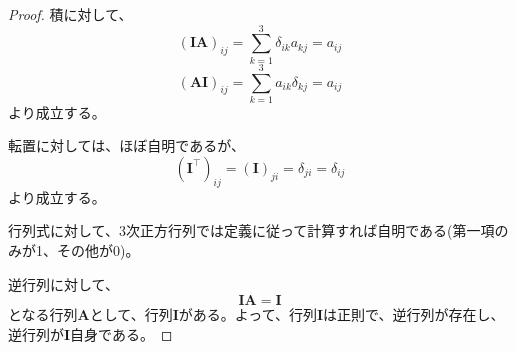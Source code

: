\begin{proof}
	積に対して、
	\begin{equation}
		(\boldsymbol{I}\boldsymbol{A})_{ij}=\sum_{k=1}^{3} \delta_{ik}a_{kj}=a_{ij}
	\end{equation}
	\begin{equation}
		(\boldsymbol{A}\boldsymbol{I})_{ij}=\sum_{k=1}^{3} a_{ik}\delta_{kj}=a_{ij}
	\end{equation}
	より成立する。

	転置に対しては、ほぼ自明であるが、
	\begin{equation}
		(\boldsymbol{I}^{\top})_{ij}=(\boldsymbol{I})_{ji}=\delta_{ji}=\delta_{ij}
	\end{equation}
	より成立する。

	行列式に対して、3次正方行列では定義に従って計算すれば自明である(第一項のみが1、その他が0)。

	逆行列に対して、
	\begin{equation}
		\boldsymbol{I}\boldsymbol{A}=\boldsymbol{I}
	\end{equation}
	となる行列\(\boldsymbol{A}\)として、行列\(\boldsymbol{I}\)がある。よって、行列\(\boldsymbol{I}\)は正則で、逆行列が存在し、逆行列が\(\boldsymbol{I}\)自身である。
\end{proof}

